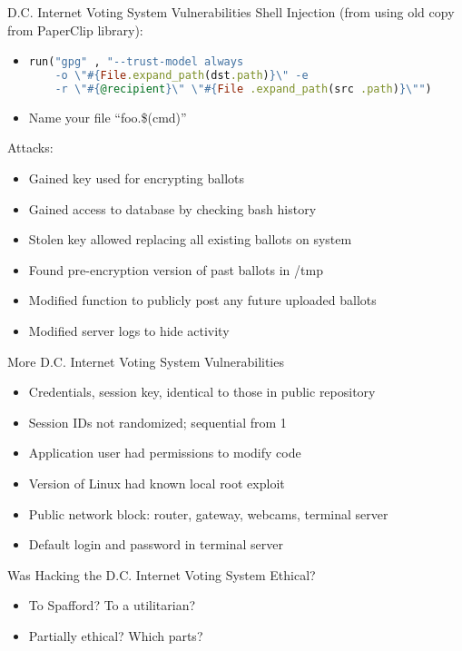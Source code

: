 \documentclass{beamer}
\begin{document}
\begin{frame}[fragile]{D.C. Internet Voting System Vulnerabilities}
Shell Injection (from using old copy from PaperClip library):
\begin{itemize}
\item[]
\begin{lstlisting}[language=Ruby]
run("gpg" , "--trust-model always
    -o \"#{File.expand_path(dst.path)}\" -e
    -r \"#{@recipient}\" \"#{File .expand_path(src .path)}\"")
\end{lstlisting}
\pause
\item[] Name your file ``foo.\$(cmd)''
\end{itemize}
\bigskip
\pause
Attacks:
\begin{itemize}
\item Gained key used for encrypting ballots
\item Gained access to database by checking bash history
\item Stolen key allowed replacing all existing ballots on system
\item Found pre-encryption version of past ballots in /tmp
\item Modified function to publicly post any future uploaded ballots
\item Modified server logs to hide activity
\end{itemize}
\end{frame}

\begin{frame}{More D.C. Internet Voting System Vulnerabilities}
\begin{itemize}
\item Credentials, session key, identical to those in public repository
\item Session IDs not randomized; sequential from 1
\item Application user had permissions to modify code
\item Version of Linux had known local root exploit
\item Public network block: router, gateway, webcams, terminal server
\item Default login and password in terminal server
\end{itemize}
\end{frame}

\begin{frame}{Was Hacking the D.C. Internet Voting System Ethical?}
\begin{itemize}
\item To Spafford? To a utilitarian?
\bigskip
\item Partially ethical? Which parts?
\end{itemize}
\end{frame}
\end{document}
